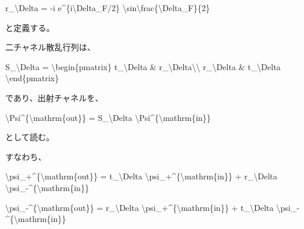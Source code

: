 \documentclass[
]{article}
\newenvironment{Shaded}{}{}
\newcommand{\NormalTok}[1]{#1}
\begin{document}
\begin{Shaded}
\begin{Highlighting}[]
\NormalTok{r\_\textbackslash{}Delta}
\NormalTok{=}
\NormalTok{{-}i e\^{}\{i\textbackslash{}Delta\_F/2\}}
\NormalTok{\textbackslash{}sin\textbackslash{}frac\{\textbackslash{}Delta\_F\}\{2\}}
\end{Highlighting}
\end{Shaded}

と定義する。

二チャネル散乱行列は、

\begin{Shaded}
\begin{Highlighting}[]
\NormalTok{S\_\textbackslash{}Delta}
\NormalTok{=}
\NormalTok{\textbackslash{}begin\{pmatrix\}}
\NormalTok{t\_\textbackslash{}Delta \& r\_\textbackslash{}Delta\textbackslash{}\textbackslash{}}
\NormalTok{r\_\textbackslash{}Delta \& t\_\textbackslash{}Delta}
\NormalTok{\textbackslash{}end\{pmatrix\}}
\end{Highlighting}
\end{Shaded}

であり、出射チャネルを、

\begin{Shaded}
\begin{Highlighting}[]
\NormalTok{\textbackslash{}Psi\^{}\{\textbackslash{}mathrm\{out\}\}}
\NormalTok{=}
\NormalTok{S\_\textbackslash{}Delta}
\NormalTok{\textbackslash{}Psi\^{}\{\textbackslash{}mathrm\{in\}\}}
\end{Highlighting}
\end{Shaded}

として読む。

すなわち、

\begin{Shaded}
\begin{Highlighting}[]
\NormalTok{\textbackslash{}psi\_+\^{}\{\textbackslash{}mathrm\{out\}\}}
\NormalTok{=}
\NormalTok{t\_\textbackslash{}Delta \textbackslash{}psi\_+\^{}\{\textbackslash{}mathrm\{in\}\}}
\NormalTok{+}
\NormalTok{r\_\textbackslash{}Delta \textbackslash{}psi\_{-}\^{}\{\textbackslash{}mathrm\{in\}\}}
\end{Highlighting}
\end{Shaded}

\begin{Shaded}
\begin{Highlighting}[]
\NormalTok{\textbackslash{}psi\_{-}\^{}\{\textbackslash{}mathrm\{out\}\}}
\NormalTok{=}
\NormalTok{r\_\textbackslash{}Delta \textbackslash{}psi\_+\^{}\{\textbackslash{}mathrm\{in\}\}}
\NormalTok{+}
\NormalTok{t\_\textbackslash{}Delta \textbackslash{}psi\_{-}\^{}\{\textbackslash{}mathrm\{in\}\}}
\end{Highlighting}
\end{Shaded}
\end{document}
